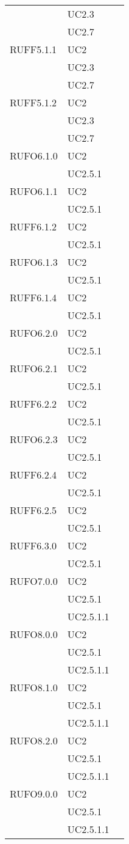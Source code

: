 \begin{center}
\begin{longtable}{lp{}l}
 & UC2.3 \\
 & UC2.7 \\
RUFF5.1.1 & UC2 \\
 & UC2.3 \\
 & UC2.7 \\
RUFF5.1.2 & UC2 \\
 & UC2.3 \\
 & UC2.7 \\
RUFO6.1.0 & UC2 \\
 & UC2.5.1 \\
RUFO6.1.1 & UC2 \\
 & UC2.5.1 \\
RUFF6.1.2 & UC2 \\
 & UC2.5.1 \\
RUFO6.1.3 & UC2 \\
 & UC2.5.1 \\
RUFF6.1.4 & UC2 \\
 & UC2.5.1 \\
RUFO6.2.0 & UC2 \\
 & UC2.5.1 \\
RUFO6.2.1 & UC2 \\
 & UC2.5.1 \\
RUFF6.2.2 & UC2 \\
 & UC2.5.1 \\
RUFO6.2.3 & UC2 \\
 & UC2.5.1 \\
RUFF6.2.4 & UC2 \\
 & UC2.5.1 \\
RUFF6.2.5 & UC2 \\
 & UC2.5.1 \\
RUFF6.3.0 & UC2 \\
 & UC2.5.1 \\
RUFO7.0.0 & UC2 \\
 & UC2.5.1 \\
 & UC2.5.1.1 \\
RUFO8.0.0 & UC2 \\
 & UC2.5.1 \\
 & UC2.5.1.1 \\
RUFO8.1.0 & UC2 \\
 & UC2.5.1 \\
 & UC2.5.1.1 \\
RUFO8.2.0 & UC2 \\
 & UC2.5.1 \\
 & UC2.5.1.1 \\
RUFO9.0.0 & UC2 \\
 & UC2.5.1 \\
 & UC2.5.1.1 \\

\end{longtable}
\end{center}
